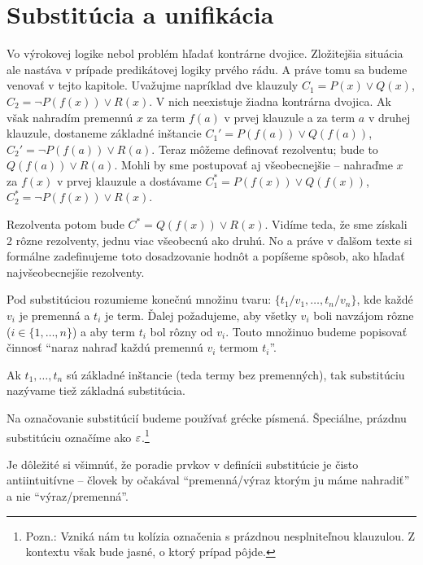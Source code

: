 \section{Substitúcia a unifikácia}

Vo výrokovej logike nebol problém hľadať kontrárne dvojice.
Zložitejšia situácia ale nastáva v prípade predikátovej logiky
prvého rádu. A práve tomu sa budeme venovať v tejto kapitole.
Uvažujme napríklad dve klauzuly
$C_1=P(x) \lor Q(x)$, $C_2 = \neg P(f(x)) \lor R(x)$.
V nich neexistuje žiadna kontrárna dvojica. Ak však nahradím premennú
$x$ za term $f(a)$ v prvej klauzule a za term $a$ v druhej klauzule,
dostaneme základné inštancie
$C_1'=P(f(a)) \lor Q(f(a))$, $C_2'=\neg P(f(a)) \lor R(a)$.
Teraz môžeme definovať rezolventu; bude to $Q(f(a)) \lor R(a)$.
Mohli by sme postupovať aj všeobecnejšie -- nahraďme $x$ za $f(x)$ v
prvej klauzule a dostávame
$ C_1^*= P(f(x)) \lor Q(f(x))$, $C_2^*= \neg P(f(x)) \lor R(x)$.

Rezolventa potom bude $C^*= Q(f(x)) \lor R(x)$.
Vidíme teda, že sme získali 2 rôzne rezolventy, jednu viac všeobecnú
ako druhú. No a práve v ďalšom texte si formálne zadefinujeme toto
dosadzovanie hodnôt a popíšeme spôsob, ako hľadať najvšeobecnejšie
rezolventy.

\begin{definicia}[Substitúcia]
    Pod substitúciou rozumieme konečnú množinu tvaru:
    $\{t_1/v_1, \ldots, t_n/v_n\}$, kde každé $v_i$ je premenná a
    $t_i$ je term.
    Ďalej požadujeme, aby všetky
    $v_i$ boli navzájom rôzne ($i \in\{1,\dots,n\}$)
    a aby term $t_i$ bol rôzny od $v_i$. Touto množinuo budeme
    popisovať činnosť ``naraz nahraď každú premennú $v_i$ termom $t_i$''.

    Ak $t_1, \ldots, t_n$ sú základné inštancie (teda termy bez premenných),
    tak substitúciu nazývame tiež základná substitúcia.
\end{definicia}

\begin{poznamka}
    Na označovanie substitúcií budeme používať grécke písmená.
    Špeciálne, prázdnu substitúciu označíme ako $\varepsilon$.\footnote{
        Pozn.: Vzniká nám tu kolízia označenia s prázdnou nesplniteľnou
        klauzulou. Z kontextu však bude jasné, o ktorý prípad pôjde.
    }
\end{poznamka}

\begin{poznamka}
    Je dôležité si všimnúť, že poradie prvkov v definícii substitúcie je
    čisto antiintuitívne -- človek by očakával ``premenná/výraz ktorým ju
    máme nahradiť'' a nie ``výraz/premenná''.
\end{poznamka}

